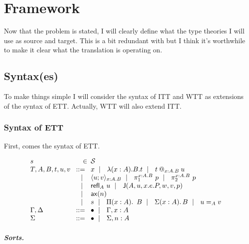 \chapter{Framework}

Now that the problem is stated, I will clearly define what the type theories
I will use as source and target. This is a bit redundant with 
but I think it's worthwhile to make it clear what the translation is operating
on.

\section{Syntax(es)}

To make things simple I will consider the syntax of \acrshort{ITT} and
\acrshort{WTT} as extensions of the syntax of \acrshort{ETT}.
Actually, \acrshort{WTT} will also extend \acrshort{ITT}.

\subsection{Syntax of \acrshort{ETT}}

First, comes the syntax of \acrshort{ETT}.

\[
  \begin{array}{l@{~\,}r@{~\,}l}
    s &\in& \cS \\
    T,A,B,t,u,v &\bnf& x \bnfor \lam{x:A}{B} t \bnfor \app{t}{x:A}{B}{u} \\
    &\bnfor& \pair{x:A}{B}{u}{v} \bnfor \pio{x:A}{B}{p} \bnfor \pit{x:A}{B}{p} \\
    &\bnfor& \refl{A} u \bnfor \J{A}{u}{x.e.P}{w}{v}{p} \\
    &\bnfor& \ax{n} \\
    &\bnfor& s \bnfor \Prod{x:A} B \bnfor \Sum{x:A} B \bnfor \Eq{A}{u}{v} \\
    \Ga, \D &\bnf& \ctxempty \bnfor \Ga, x:A \\
    \Sigma &\bnf& \ctxempty \bnfor \Sigma, n:A
  \end{array}
\]

\paragraph{Sorts.}

